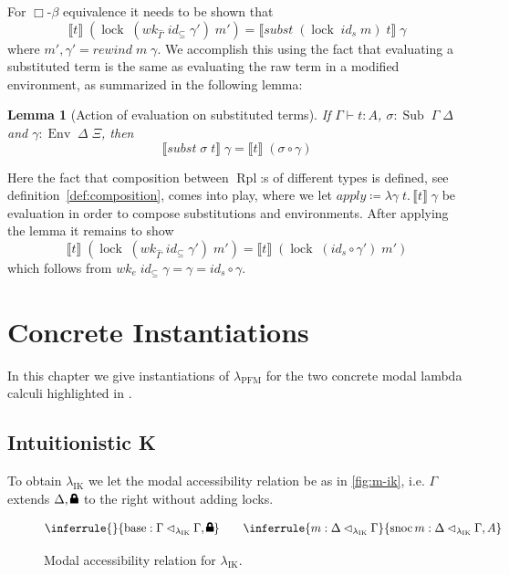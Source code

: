 \documentclass[12pt,twoside,openright]{report}
\numberwithin{equation}{chapter}
\numberwithin{figure}{chapter}
\numberwithin{table}{chapter}
\newtheorem{lemma}[theorem]{Lemma}
\theoremstyle{definition}\newtheorem{definition}{Definition}
\newcommand{\lock}{\text{\tikz[baseline]{
      \fill[rounded corners=.1ex] (-.75ex,0) rectangle (.75ex,1ex);
      \draw[line width=.3ex] (-.4ex,.5ex) -- ++(0,.75ex) arc (180:0:.4ex) -- ++(0,-.75ex);
}}}
\begin{document}
For $\Box\text{-}\beta$ equivalence it needs to be shown that
$$ \llbracket t \rrbracket \; (\operatorname{lock} \; (\textit{wk}_{\widehat\Gamma} \; \textit{id}_\subseteq \; \gamma') \; m') = \llbracket \textit{subst} \; (\operatorname{lock} \; \textit{id}_s \; m) \; t \rrbracket \; \gamma $$
where $m' , \gamma' = \textit{rewind} \; m \; \gamma$.
We accomplish this using the fact that evaluating a substituted term
is the same as evaluating the raw term in a modified environment,
as summarized in the following lemma:
\begin{lemma}[Action of evaluation on substituted terms]
  If $\Gamma \vdash t : A$, $\sigma : \operatorname{Sub} \; \Gamma \; \Delta$
  and $\gamma : \operatorname{Env} \; \Delta \; \Xi$, then
  $$ \llbracket \textit{subst} \; \sigma \; t \rrbracket \; \gamma = \llbracket t \rrbracket \; (\sigma \circ \gamma) $$
\end{lemma}
Here the fact that composition between $\operatorname{Rpl}$:s of different types is defined,
see definition~\ref{def:composition}, comes into play,
where we let $\textit{apply} \coloneqq \lambda \gamma \; t.\, \llbracket t \rrbracket \; \gamma$ be evaluation
in order to compose substitutions and environments.
After applying the lemma it remains to show
$$ \llbracket t \rrbracket \; (\operatorname{lock} \; (\textit{wk}_{\widehat\Gamma} \; \textit{id}_\subseteq \; \gamma') \; m') = \llbracket t \rrbracket \; (\operatorname{lock} \; (\textit{id}_s \circ \gamma') \; m') $$
which follows from
$wk_e \; \textit{id}_\subseteq \; \gamma = \gamma = \textit{id}_s \circ \gamma$.

\chapter{Concrete Instantiations}\label{sec:instantiations}

In this chapter we give instantiations of $\lambda_\text{PFM}$
for the two concrete modal lambda calculi highlighted in \cite{valliappan22}.

\section{Intuitionistic K}

To obtain $\lambda_\text{IK}$ we let the modal accessibility relation be
as in \autoref{fig:m-ik},
i.e. $\Gamma$ extends $\Delta, \lock$ to the right without adding locks.

\begin{figure}
  \centering
  \begin{equation*}
    \inferrule{}{\operatorname{base} : \Gamma \lhd_{\lambda_\text{IK}} \Gamma, \lock} \qquad
    \inferrule{m : \Delta \lhd_{\lambda_\text{IK}} \Gamma}{\operatorname{snoc} m : \Delta \lhd_{\lambda_\text{IK}} \Gamma, A}
  \end{equation*}
  \caption{Modal accessibility relation for $\lambda_\text{IK}$. \label{fig:m-ik}}
\end{figure}
\end{document}
